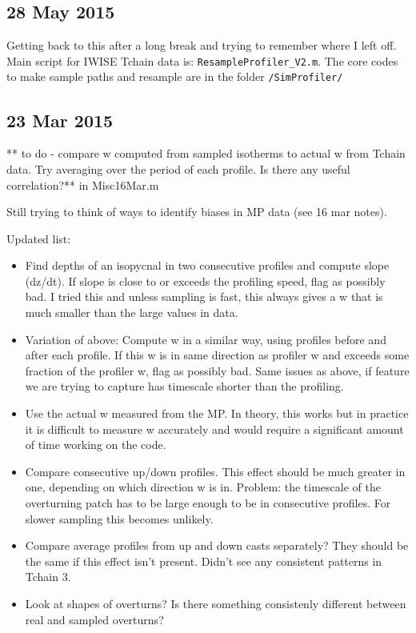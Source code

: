 \documentclass[11pt]{article}
\begin{document}
\clearpage
\newpage
\subsection{28 May 2015}

Getting back to this after a long break and trying to remember where I left off.  Main script for IWISE Tchain data is: \verb+ResampleProfiler_V2.m+. The core codes to make sample paths and resample are in the folder \verb+/SimProfiler/+




\clearpage
\newpage
\subsection{23 Mar 2015}


** to do - compare w computed from sampled isotherms to actual w from Tchain data. Try averaging over the period of each profile. Is there any useful correlation?** in Misc16Mar.m

Still trying to think of ways to identify biases in MP data (see 16 mar notes).

Updated list:
\begin{itemize}
\item Find depths of an isopycnal in two consecutive profiles and compute slope (dz/dt). If slope is close to or exceeds the profiling speed, flag as possibly bad. I tried this and unless sampling is fast, this always gives a w that is much smaller than the large values in data.
\item Variation of above: Compute w in a similar way, using profiles before and after each profile. If this w is in same direction as profiler w and exceeds some fraction of the profiler w, flag as possibly bad. Same issues as above, if feature we are trying to capture has timescale shorter than the profiling.
\item Use the actual w measured from the MP. In theory, this works but in practice it is difficult to measure w accurately and would require a significant amount of time working on the code. 
\item Compare consecutive up/down profiles. This effect should be much greater in one, depending on which direction w is in. Problem: the timescale of the overturning patch has to be large enough to be in consecutive profiles. For slower sampling this becomes unlikely.
\item Compare average profiles from up and down casts separately? They should be the same if this effect isn't present. Didn't see any consistent patterns in Tchain 3.
\item Look at shapes of overturns? Is there something consistenly different between real and sampled overturns?
\end{itemize}
\end{document}
